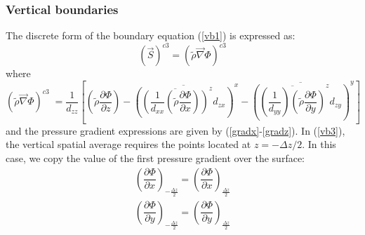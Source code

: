 \subsubsection {Vertical boundaries}
The discrete form of the boundary equation (\ref{vb1}) is expressed as:
\begin{equation}
\left(\vec{S}\right)^{c3} = \left( \tilde{\rho} \overrightarrow{\nabla} \Phi
 \right) ^{c3}
\end{equation}
where
\begin{equation}
\label{vb3}
\left( \tilde{\rho}  \overrightarrow{\nabla} \Phi \right) ^{c3} \;   =
\dfrac{1}{d_{zz}}
\left[ \left( \tilde{\rho} \dfrac {\partial \Phi}{\partial z} \right)  -
\overline{\left( \overline{\left(
 \dfrac{ 1}{d_{xx}}\left(\tilde{\rho}  \dfrac {\partial \Phi}{\partial x}
\right) \right)}^{z} d_{zx}\right)}^{x}
-  \overline{\left( \overline{\left(\dfrac{ 1
}{d_{yy}}\right)\left(\tilde{\rho} \dfrac {\partial
\Phi}{\partial y} \right)}^{z}d_{zy}\right)}^{y}\right]
\end{equation}
and the pressure gradient expressions are given by (\ref{gradx}-\ref{gradz}).
In (\ref{vb3}), the vertical spatial average requires the points located at
$z = - \Delta z/2$. In this case, we copy the value of the first
pressure gradient over the surface:
\begin{eqnarray*}
\left( \dfrac {\partial \Phi} {\partial x} \right)_{-\frac{\Delta z}{2} } =
 \left( \dfrac {\partial \Phi} {\partial x} \right)_{\frac{\Delta z}{2} } \\
\left( \dfrac {\partial \Phi} {\partial y} \right)_{-\frac{\Delta z}{2} } =
 \left( \dfrac {\partial \Phi} {\partial y} \right)_{\frac{\Delta z}{2} } \\
\end{eqnarray*}

